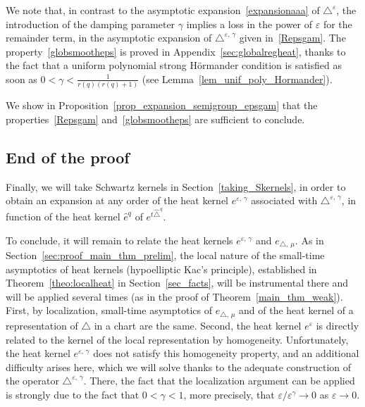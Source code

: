 \documentclass[AHL,Unicode,published]{cedram}
\begin{document}
We note that, in contrast to the asymptotic expansion~\eqref{expansionaaa} of $\triangle^\varepsilon$, the introduction of the damping parameter $\gamma$ implies a loss in the power of $\varepsilon$ for the remainder term, in the asymptotic expansion of $\triangle^{\varepsilon,\,\gamma}$ given in~\eqref{Repsgam}. The property~\eqref{globsmootheps} is proved in Appendix~\ref{sec:globalregheat}, thanks to the fact that a uniform polynomial strong H\"ormander condition is satisfied as soon as $0<\gamma<\frac{1}{r(q)(r(q)+1)}$ (see Lemma~\ref{lem_unif_poly_Hormander}).

We show in Proposition~\ref{prop_expansion_semigroup_epsgam} that the properties~\eqref{Repsgam} and~\eqref{globsmootheps} are sufficient to conclude.



\subsection{End of the proof}
Finally, we will take Schwartz kernels in Section~\ref{taking_Skernels}, in order to obtain an expansion at any order of the heat kernel $e^{\varepsilon,\,\gamma}$ associated with $\triangle^{\varepsilon,\,\gamma}$, in function of the heat kernel $\widehat{e}^{q}$ of $e^{t\widehat{\triangle}^{q}}$.

To conclude, it will remain to relate the heat kernels $e^{\varepsilon,\,\gamma}$ and $e_{\triangle,\,\mu}$. As in Section~\ref{sec:proof_main_thm_prelim}, the local nature of the small-time asymptotics of heat kernels (hypoelliptic Kac's principle), established in Theorem~\ref{theo:localheat} in Section~\ref{sec_facts}, will be instrumental there and will be applied several times (as in the proof of Theorem~\ref{main_thm_weak}). First, by localization, small-time asymptotics of $e_{\triangle,\,\mu}$ and of the heat kernel of a representation of $\triangle$ in a chart are the same. Second, the heat kernel $e^\varepsilon$ is directly related to the kernel of the local representation by homogeneity. Unfortunately, the heat kernel $e^{\varepsilon,\,\gamma}$ does not satisfy this homogeneity property, and an additional difficulty arises here, which we will solve thanks to the adequate construction of the operator $\triangle^{\varepsilon,\,\gamma}$. There, the fact that the localization argument can be applied is strongly due to the fact that $0<\gamma<1$, more precisely, that $\varepsilon/\varepsilon^\gamma\rightarrow 0$ as $\varepsilon\rightarrow 0$.
\vspace{2em}
\end{document}
